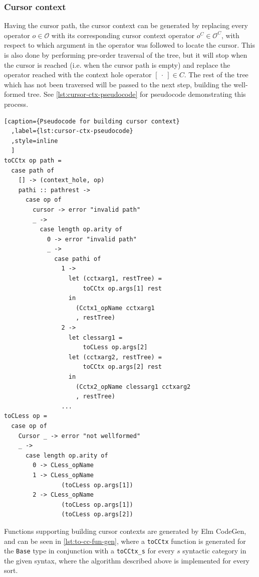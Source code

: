 \subsubsection{Cursor context}

Having the cursor path, the cursor context can be generated by replacing every
operator $o \in \mathcal{O}$ with its corresponding cursor context operator
$o^C \in \mathcal{O}^C$, with respect to which argument in the operator was
followed to locate the cursor. This is also done by performing pre-order traversal
of the tree, but it will stop when the cursor is reached (i.e. when the
cursor path is empty) and replace the operator reached with the
context hole operator $[ \ \cdot \ ] \in C$. The rest of the tree which has not
been traversed will be passed to the next step, building the well-formed tree.
See \cref{lst:cursor-ctx-pseudocode} for pseudocode demonstrating this process.

\begin{minipage}{\textwidth}
  \begin{lstlisting}[caption={Pseudocode for building cursor context}
  ,label={lst:cursor-ctx-pseudocode}
  ,style=inline
  ]
toCCtx op path =
  case path of
    [] -> (context_hole, op)
    pathi :: pathrest -> 
      case op of
        cursor -> error "invalid path"
        _ ->
          case length op.arity of
            0 -> error "invalid path"
            _ ->
              case pathi of
                1 ->
                  let (cctxarg1, restTree) = 
                      toCCtx op.args[1] rest
                  in
                    (Cctx1_opName cctxarg1
                    , restTree) 
                2 ->
                  let clessarg1 =
                      toCLess op.args[2]
                  let (cctxarg2, restTree) = 
                      toCCtx op.args[2] rest
                  in
                    (Cctx2_opName clessarg1 cctxarg2
                    , restTree)
                ...
toCLess op =
  case op of
    Cursor _ -> error "not wellformed"
    _ ->
      case length op.arity of
        0 -> CLess_opName
        1 -> CLess_opName 
                (toCLess op.args[1])
        2 -> CLess_opName 
                (toCLess op.args[1]) 
                (toCLess op.args[2])
\end{lstlisting}
\end{minipage}

Functions supporting building cursor contexts are generated by Elm CodeGen, and can be seen in
\cref{lst:to-cc-fun-gen}, where a \texttt{toCCtx} function is generated
for the \texttt{Base} type in conjunction with a
\texttt{toCCtx\_s} for every $s$ syntactic category in the given syntax, where
the algorithm described above is implemented for every sort.

